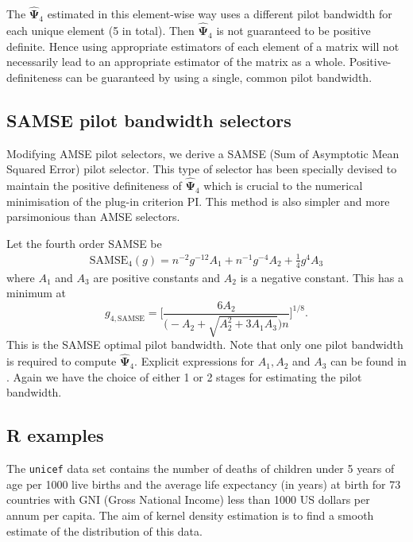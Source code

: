 \documentclass[a4paper,11pt]{article}
\newcommand{\gmat}[1]{\boldsymbol{#1}}
\def\SAMSE{\mathrm{SAMSE}}
\begin{document}
The $\hat{\gmat{\Psi}}_4$ estimated in this element-wise 
way uses a different pilot bandwidth for each unique element 
(5 in total). Then $\hat{\gmat{\Psi}}_4$ is not guaranteed to be positive
definite.  Hence using appropriate estimators of each element
of a matrix will not necessarily lead to an appropriate estimator
of the matrix as a whole.
Positive-definiteness can be guaranteed by using a single, common pilot bandwidth. 

\subsection{SAMSE pilot bandwidth selectors}
Modifying AMSE pilot selectors, we derive
a SAMSE (Sum of Asymptotic Mean Squared Error) pilot selector.
This type of selector has been specially devised to maintain the
positive definiteness of $\hat{\gmat{\Psi}}_4$ which is
crucial to the numerical minimisation of the plug-in criterion PI. This
method is also simpler and more parsimonious than AMSE
selectors.

Let  the fourth order SAMSE be 
\begin{align}
\SAMSE_4(g) = n^{-2}g^{-12} A_1 + n^{-1} g^{-4} A_2 + \tfrac{1}{4} g^4 A_3
\end{align}
where $A_1$ and $A_3$ are positive constants and 
$A_2$ is a negative constant.  This has a minimum at 
\begin{equation} 
\label{eq:gsamse} 
g_{4, \SAMSE} =
\bigg[ \frac{6 A_2} {\big( - A_2 
+ \sqrt{ A_2^2  +  3 A_1 A_3}\big)n}\bigg]^{1/8}.
\end{equation}
This is the SAMSE optimal pilot bandwidth. Note that only one pilot bandwidth
is required to compute $\hat{\gmat{\Psi}}_4$. Explicit expressions for 
$A_1, A_2$ and $A_3$ can be found in \citet*{duong03}.  Again we have the choice of
either 1 or 2 stages for estimating the pilot bandwidth.


\subsection{R examples}
 
The \texttt{unicef} data set contains the number of deaths of children under 5
years of age per 1000 live births and the average life expectancy
(in years) at birth for 73 countries with GNI (Gross National
Income) less than 1000 US dollars per annum per capita. 
The aim of kernel density estimation
is to find a smooth estimate of the distribution of this data.
\end{document}
